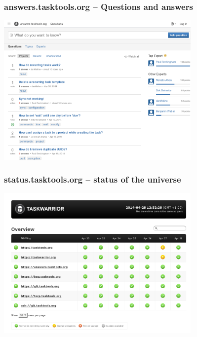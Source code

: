 \documentclass[t,handout]{beamer}
\begin{document}
\begin{frame}\frametitle{answers.tasktools.org -- Questions and answers}
\begin{center}
\href{http://answers.tasktools.org/}{\includegraphics[width=10cm,height=7.5cm]{answers-tasktools-org.png}}
\end{center}
\end{frame}

\begin{frame}\frametitle{status.tasktools.org -- status of the universe}
\begin{center}
\href{http://status.tasktools.org/}{\includegraphics[width=10cm,height=7.5cm]{status-tasktools-org.png}}
\end{center}
\end{frame}
\end{document}
